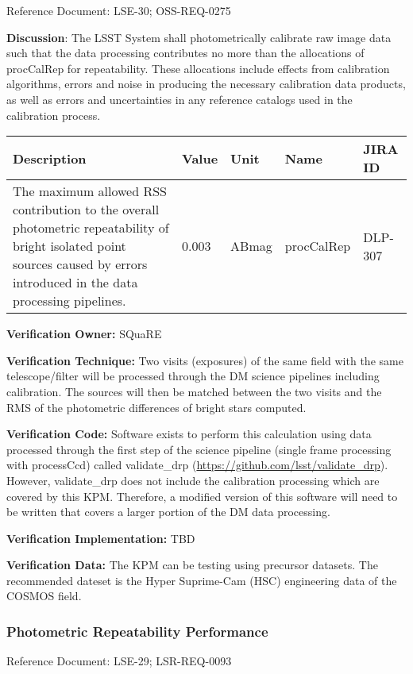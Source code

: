 \documentclass[DM,lsstdraft,toc]{lsstdoc}
\begin{document}
Reference Document: LSE-30; OSS-REQ-0275

\textbf{Discussion}: The LSST System shall photometrically calibrate raw
image data such that the data processing contributes no more than the
allocations of procCalRep for repeatability. These allocations include
effects from calibration algorithms, errors and noise in producing the
necessary calibration data products, as well as errors and uncertainties
in any reference catalogs used in the calibration process.

\begin{longtable}[]{@{}p{}llll@{}}
\toprule
Description & Value & Unit & Name & JIRA ID\tabularnewline
\midrule
\endhead
The maximum allowed RSS contribution to the overall photometric
repeatability of bright isolated point sources caused by errors
introduced in the data processing pipelines. & 0.003 & ABmag &
procCalRep & DLP-307\tabularnewline
\bottomrule
\end{longtable}

\textbf{Verification Owner:} SQuaRE

\textbf{Verification Technique:} Two visits (exposures) of the same
field with the same telescope/filter will be processed through the DM
science pipelines including calibration. The sources will then be
matched between the two visits and the RMS of the photometric
differences of bright stars computed.

\textbf{Verification Code:} Software exists to perform this calculation
using data processed through the first step of the science pipeline
(single frame processing with processCcd) called validate\_drp
(\url{https://github.com/lsst/validate_drp}). However, validate\_drp
does not include the calibration processing which are covered by this
KPM. Therefore, a modified version of this software will need to be
written that covers a larger portion of the DM data processing.

\textbf{Verification Implementation:} TBD

\textbf{Verification Data:} The KPM can be testing using precursor
datasets. The recommended dateset is the Hyper Suprime-Cam (HSC)
engineering data of the COSMOS field.

\subsubsection{Photometric Repeatability
Performance}\label{photometric-repeatability-performance}

Reference Document: LSE-29; LSR-REQ-0093
\end{document}
